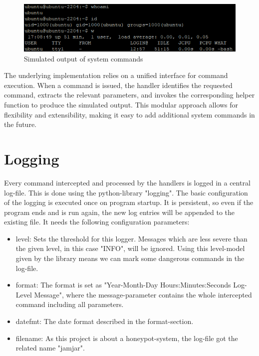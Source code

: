 \begin{figure}[H]
    \centering
    \includegraphics[width=1\linewidth]{bilder/system.png}
    \caption{Simulated output of system commands}
    \label{fig:enter-label}
\end{figure}

The underlying implementation relies on a unified interface for command execution. When a command is issued, the handler identifies the requested command, extracts the relevant parameters, and invokes the corresponding helper function to produce the simulated output. This modular approach allows for flexibility and extensibility, making it easy to add additional system commands in the future.

\section{Logging}
Every command intercepted and processed by the handlers is logged in a central log-file. This is done using the python-library "logging". The basic configuration of the logging is executed once on program startup. It is persistent, so even if the program ends and is run again, the new log entries will be appended to the existing file. It needs the following configuration parameters: \newline

\begin{itemize}
    \item level: Sets the threshold for this logger. Messages which are less severe than the given level, in this case "INFO", will be ignored. Using this level-model given by the library means we can mark some dangerous commands in the log-file.
    \item format: The format is set as "Year-Month-Day Hours:Minutes:Seconds Log-Level Message", where the message-parameter contains the whole intercepted command including all parameters.
    \item datefmt: The date format described in the format-section.
    \item filename: As this project is about a honeypot-system, the log-file got the related name "jamjar".
\end{itemize}

